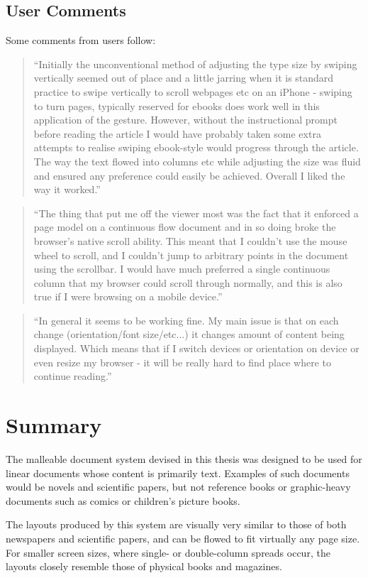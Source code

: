 \subsection{User Comments}
Some comments from users follow:

{\raggedright
\begin{quote}
``Initially the unconventional method of adjusting the type size by swiping vertically seemed out of place and a little jarring when it is standard practice to swipe vertically to scroll webpages etc on an iPhone - swiping to turn pages, typically reserved for ebooks does work well in this application of the gesture. However, without the instructional prompt before reading the article I would have probably taken some extra attempts to realise swiping ebook-style would progress through the article. The way the text flowed into columns etc while adjusting the size was fluid and ensured any preference could easily be achieved. Overall I liked the way it worked.''
\end{quote}

\begin{quote}
``The thing that put me off the viewer most was the fact that it enforced a page model on a continuous flow document and in so doing broke the browser's native scroll ability. This meant that I couldn't use the mouse wheel to scroll, and I couldn't jump to arbitrary points in the document using the scrollbar. I would have much preferred a single continuous column that my browser could scroll through normally, and this is also true if I were browsing on a mobile device.''
\end{quote}

\begin{quote}
``In general it seems to be working fine. My main issue is that on each change (orientation/font size/etc...) it changes amount of content being displayed. Which means that if I switch devices or orientation on device or even resize my browser - it will be really hard to find place where to continue reading.''
\end{quote}
}



\section{Summary}
The malleable document system devised in this thesis was designed to be used for linear documents whose content is primarily text. Examples of such documents would be novels and scientific papers, but not reference books or graphic-heavy documents such as comics or children's picture books.

The layouts produced by this system are visually very similar to those of both newspapers and scientific papers, and can be flowed to fit virtually any page size. For smaller screen sizes, where single- or double-column spreads occur, the layouts closely resemble those of physical books and magazines.

